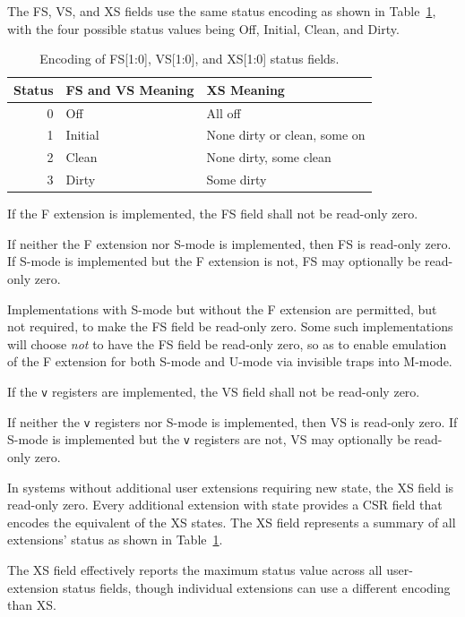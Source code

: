 The FS, VS, and XS fields use the same status encoding as shown in
Table~\ref{fsxsencoding}, with the four possible status values being
Off, Initial, Clean, and Dirty.

\begin{table}[h!]
\begin{center}
\begin{tabular}{|r|l|l|}
\hline
Status  & FS and VS Meaning & XS Meaning\\
\hline
0 & Off     &  All off \\
1 & Initial &  None dirty or clean, some on\\
2 & Clean   &  None dirty, some clean \\
3 & Dirty   &  Some dirty \\
\hline
\end{tabular}
\end{center}
\caption{Encoding of FS[1:0], VS[1:0], and XS[1:0] status fields.}
\label{fsxsencoding}
\end{table}

If the F extension is implemented, the FS field shall not be
read-only zero.

If neither the F extension nor S-mode is implemented, then FS is
read-only zero.
If S-mode is implemented but the F extension is not, FS may optionally
be read-only zero.

\begin{commentary}
Implementations with S-mode but without the F extension are
permitted, but not required, to make the FS field be read-only zero.
Some such implementations will choose {\em not} to have the FS
field be read-only zero, so as to enable emulation of the F extension for
both S-mode and U-mode via invisible traps into M-mode.
\end{commentary}

If the {\tt v} registers are implemented, the VS field shall not be
read-only zero.

If neither the {\tt v} registers nor S-mode is implemented, then VS
is read-only zero.
If S-mode is implemented but the {\tt v} registers are not, VS may
optionally be read-only zero.

In systems without additional user extensions requiring new state, the
XS field is read-only zero.  Every additional extension with state
provides a CSR field that encodes the equivalent of the XS states.
The XS field represents a summary of all
extensions' status as shown in Table~\ref{fsxsencoding}.

\begin{commentary}
The XS field effectively reports the maximum status value across all
user-extension status fields, though individual extensions can use a
different encoding than XS.
\end{commentary}

